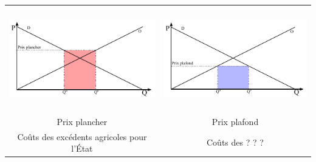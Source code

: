 \begin{center}
	\begin{tabular}{cc}
		\includegraphics[height=4.5cm]{images/graph_prix_plancher.pdf} & \includegraphics[height=4.5cm]{images/graph_prix_plafond.pdf}\\
		Prix plancher                                                  & Prix plafond\\
		\textcolor[rgb]{1,0,0}{Coûts des excédents agricoles pour l'État} & \textcolor[rgb]{0,0,1}{Coûts des ? ? ?}\\
	\end{tabular}
\end{center}